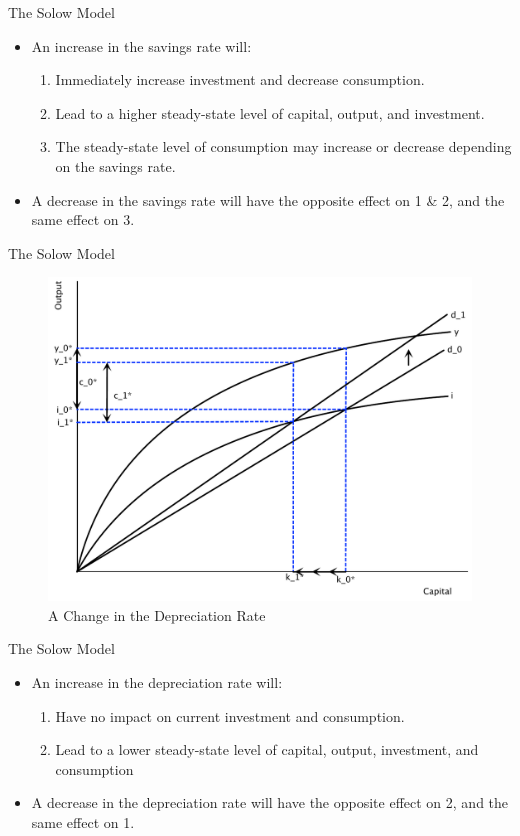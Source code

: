 \documentclass[xcolor={dvipsnames},pdf, hyperref={colorlinks=true, citecolor=ForestGreen, linkcolor=BlueViolet, urlcolor=Magenta}]{beamer}
\theoremstyle{definition}
\begin{document}
\begin{frame}{The Solow Model}
\begin{itemize}
	\item An increase in the savings rate will:
	\begin{enumerate}
		\item Immediately increase investment and decrease consumption.
		\item Lead to a higher steady-state level of capital, output, and investment.
		\item The steady-state level of consumption may increase or decrease depending on the savings rate.
	\end{enumerate}
	\item A decrease in the savings rate will have the opposite effect on 1 \& 2, and the same effect on 3.
\end{itemize}
\end{frame}

\begin{frame}[b]{The Solow Model}
\begin{figure}[H]
	\centering
	\includegraphics[scale=.35]{plot87.pdf}
	\caption{A Change in the Depreciation Rate}
\end{figure}
\end{frame}

\begin{frame}{The Solow Model}
\begin{itemize}
	\item An increase in the depreciation rate will:
	\begin{enumerate}
		\item Have no impact on current investment and consumption.
		\item Lead to a lower steady-state level of capital, output, investment, and consumption
	\end{enumerate}
	\item A decrease in the depreciation rate will have the opposite effect on 2, and the same effect on 1.
\end{itemize}
\end{frame}
\end{document}
